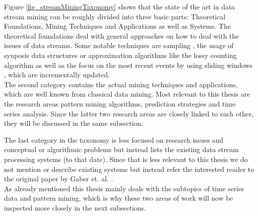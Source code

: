 Figure \ref{fig_streamMiningTaxonomy} shows that the state of the art in data stream mining can be roughly divided into three basic parts: Theoretical Foundations, Mining Techniques and Applications as well as Systems. The theoretical foundations deal with general approaches on how to deal with the issues of data streams. Some notable techniques are sampling \cite{manku1999random}, the usage of synposis data structures or approximation algorithms like the lossy counting algorithm \cite{manku2002approximate} as well as the focus on the most recent events by using sliding windows \cite{gama2010knowledge}, which are incrementally updated.\\
The second category contains the actual mining techniques and applications, which are well known from classical data mining. Most relevant to this thesis are the research areas pattern mining algorithms, prediction strategies and time series analysis. Since the latter two research areas are closely linked to each other, they will be discussed in the same subsection.

The last category in the taxonomy is less focused on research issues and conceptual or algorithmic problems but instead lists the existing data stream processing systems (to that date). Since that is less relevant to this thesis we do not mention or describe existing systems but instead refer the interested reader to the original paper by Gaber et. al. \cite{gaber2005mining}. \\
As already mentioned this thesis mainly deals with the subtopics of time series data and pattern mining, which is why these two areas of work will now be inspected more closely in the next subsections.\\

